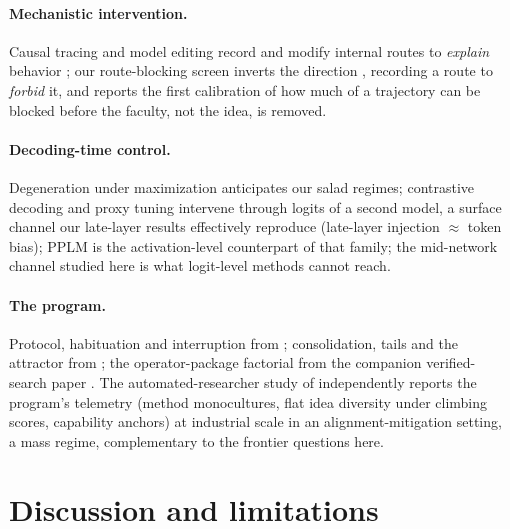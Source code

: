 \documentclass[11pt]{article}
\begin{document}
\paragraph{Mechanistic intervention.} Causal tracing and model editing
record and modify internal routes to \emph{explain} behavior
\citep{meng2022rome}; our route-blocking screen inverts the direction
, recording a route to \emph{forbid} it, and reports the first
calibration of how much of a trajectory can be blocked before the
faculty, not the idea, is removed.

\paragraph{Decoding-time control.} Degeneration under maximization
\citep{holtzman2020curious} anticipates our salad regimes;
contrastive decoding \citep{li2022contrastive} and proxy tuning
\citep{liu2024proxy} intervene through logits of a second model, a
surface channel our late-layer results effectively reproduce
(late-layer injection $\approx$ token bias); PPLM
\citep{dathathri2020pplm} is the activation-level counterpart of that
family; the mid-network channel studied here is what logit-level
methods cannot reach.

\paragraph{The program.} Protocol, habituation and interruption from
\citet{ono2026interrupting}; consolidation, tails and the attractor
from \citet{ono2026mass}; the operator-package factorial from the
companion verified-search paper \citep{ono2026operator}. The automated-researcher study of
\citet{chen2026automated} independently reports the program's telemetry
(method monocultures, flat idea diversity under climbing scores,
capability anchors) at industrial scale in an alignment-mitigation
setting, a mass regime, complementary to the frontier questions
here.

\section{Discussion and limitations}
\label{sec:discussion}
\end{document}
